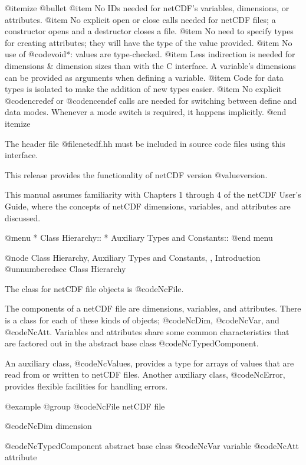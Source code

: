 @itemize @bullet
@item
No IDs needed for netCDF's variables, dimensions, or attributes.
@item
No explicit open or close calls needed for netCDF files; a constructor
opens and a destructor closes a file.
@item
No need to specify types for creating attributes; they will have the
type of the value provided.
@item
No use of @code{void*}: values are type-checked.
@item
Less indirection is needed for dimensions & dimension sizes than with
the C interface.  A variable's dimensions can be provided as arguments 
when defining a variable.
@item
Code for data types is isolated to make the addition of new
types easier.
@item
No explicit @code{ncredef} or @code{ncendef} calls are needed for
switching between define and data modes.  Whenever a mode switch is
required, it happens implicitly.
@end itemize

The header file @file{netcdf.hh} must be included in source code files
using this interface.

This release provides the functionality of netCDF version
@value{version}.

This manual assumes familiarity with Chapters 1 through 4 of the netCDF
User's Guide, where the concepts of netCDF dimensions, variables, and
attributes are discussed.

@menu
* Class Hierarchy::             
* Auxiliary Types and Constants::  
@end menu

@node Class Hierarchy, Auxiliary Types and Constants,  , Introduction
@unnumberedsec Class Hierarchy

The class for netCDF file objects is @code{NcFile}.

The components of a netCDF file are dimensions, variables, and
attributes.  There is a class for each of these kinds of objects;
@code{NcDim}, @code{NcVar}, and @code{NcAtt}.  Variables and attributes
share some common characteristics that are factored out in the
abstract base class @code{NcTypedComponent}.

An auxiliary class, @code{NcValues}, provides a type for arrays of values
that are read from or written to netCDF files.  Another auxiliary class,
@code{NcError}, provides flexible facilities for handling errors.

@example
@group
@code{NcFile}                     netCDF file

@code{NcDim}                      dimension

@code{NcTypedComponent}           abstract base class
        @code{NcVar}                variable
        @code{NcAtt}                attribute

